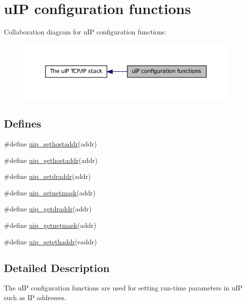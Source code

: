 \hypertarget{group__uipconffunc}{
\section{uIP configuration functions}
\label{group__uipconffunc}
}


Collaboration diagram for uIP configuration functions:
\nopagebreak
\begin{figure}[H]
\begin{center}
\leavevmode
\includegraphics[width=372pt]{group__uipconffunc}
\end{center}
\end{figure}


\subsection*{Defines}
\begin{DoxyCompactItemize}
\item 
\#define \hyperlink{group__uipconffunc_ga12b467f314489259dd718228d0827a51}{uip\_\-sethostaddr}(addr)
\item 
\#define \hyperlink{group__uipconffunc_ga20bc87e5c063c3f4b01547be6e5a0148}{uip\_\-gethostaddr}(addr)
\item 
\#define \hyperlink{group__uipconffunc_ga41d37ea1e3bd24f7b51e9409aceaaa80}{uip\_\-setdraddr}(addr)
\item 
\#define \hyperlink{group__uipconffunc_gaeb79c914cf137e6d27fd7583e5a66679}{uip\_\-setnetmask}(addr)
\item 
\#define \hyperlink{group__uipconffunc_gad8e8bc9bc0e2ea4a24a8a024fd3a7f7c}{uip\_\-getdraddr}(addr)
\item 
\#define \hyperlink{group__uipconffunc_ga5323320b7316647042016f17c4e881be}{uip\_\-getnetmask}(addr)
\item 
\#define \hyperlink{group__uipconffunc_ga30e827f33eacff55ecb4d8fb5a11d5d1}{uip\_\-setethaddr}(eaddr)
\end{DoxyCompactItemize}


\subsection{Detailed Description}
The uIP configuration functions are used for setting run-\/time parameters in uIP such as IP addresses. 

